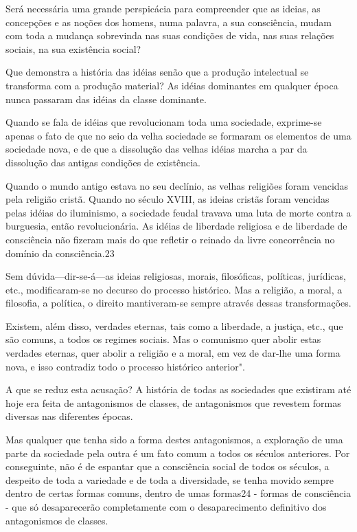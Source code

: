 Será necessária uma grande perspicácia para compreender que as ideias,
as concepções e as noções dos homens, numa palavra, a sua consciência,
mudam com toda a mudança sobrevinda nas suas condições de vida, nas
suas relações sociais, na sua existência social?

Que demonstra a história das idéias senão que a produção intelectual
se transforma com a produção material? As idéias dominantes em
qualquer época nunca passaram das idéias da classe dominante.

Quando se fala de idéias que revolucionam toda uma sociedade,
exprime-se apenas o fato de que no seio da velha sociedade se formaram
os elementos de uma sociedade nova, e de que a dissolução das velhas
idéias marcha a par da dissolução das antigas condições de existência.

Quando o mundo antigo estava no seu declínio, as velhas religiões
foram vencidas pela religião cristã. Quando no século XVIII, as ideias
cristãs foram vencidas pelas idéias do iluminismo, a sociedade feudal
travava uma luta de morte contra a burguesia, então revolucionária. As
idéias de liberdade religiosa e de liberdade de consciência não
fizeram mais do que refletir o reinado da livre concorrência no
domínio da consciência.23

Sem dúvida---dir-se-á---as ideias religiosas, morais, filosóficas,
políticas, jurídicas, etc., modificaram-se no decurso do processo
histórico. Mas a religião, a moral, a filosofia, a política, o direito
mantiveram-se sempre através dessas transformações.

Existem, além disso, verdades eternas, tais como a liberdade, a
justiça, etc., que são comuns, a todos os regimes sociais. Mas o
comunismo quer abolir estas verdades eternas, quer abolir a religião e
a moral, em vez de dar-lhe uma forma nova, e isso contradiz todo o
processo histórico anterior".

A que se reduz esta acusação? A história de todas as sociedades que
existiram até hoje era feita de antagonismos de classes, de
antagonismos que revestem formas diversas nas diferentes épocas.

Mas qualquer que tenha sido a forma destes antagonismos, a exploração
de uma parte da sociedade pela outra é um fato comum a todos os
séculos anteriores. Por conseguinte, não é de espantar que a
consciência social de todos os séculos, a despeito de toda a variedade
e de toda a diversidade, se tenha movido sempre dentro de certas
formas comuns, dentro de umas formas24 - formas de consciência - que
só desaparecerão completamente com o desaparecimento definitivo dos
antagonismos de classes.

